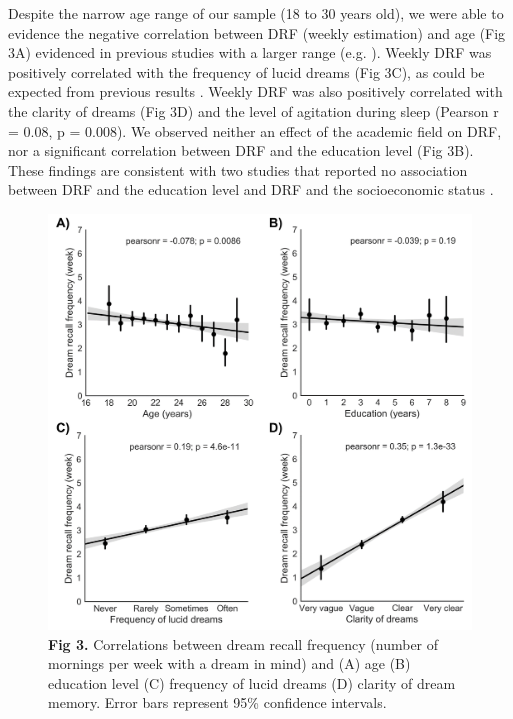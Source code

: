 Despite the narrow age range of our sample (18 to 30 years old), we were able to evidence the negative correlation between DRF (weekly estimation) and age (Fig 3A) evidenced in previous studies with a larger range (e.g. \citealp{schredl_dream_2008}). Weekly DRF was positively correlated with the frequency of lucid dreams (Fig 3C), as could be expected from previous results \citep{stepansky_austrian_1998, schredl_lucid_2004, schredl_frequency_2011}. Weekly DRF was also positively correlated with the clarity of dreams (Fig 3D) and the level of agitation during sleep (Pearson r = 0.08, p = 0.008). We observed neither an effect of the academic field on DRF, nor a significant correlation between DRF and the education level (Fig 3B). These findings are consistent with two studies that reported no association between DRF and the education level and DRF and the socioeconomic status \citep{schredl_dream_2007, schredl_dream_2008}.

\begin{figure}[htb]
	\includegraphics[width=\textwidth]{Fig/Results/Survey/Fig3.png}
	\caption*{\textbf{Fig 3.} Correlations between dream recall frequency (number of mornings per week with a dream in mind) and (A) age (B) education level (C) frequency of lucid dreams (D) clarity of dream memory. Error bars represent 95\% confidence intervals.}
\end{figure}

